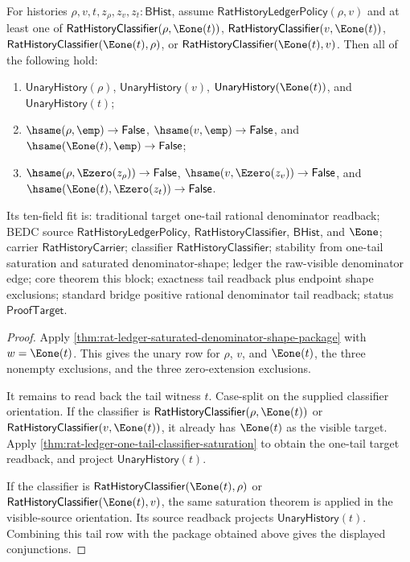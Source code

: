 \begin{theorem}
\label{thm:rat-ledger-one-tail-denominator-shape-readback}
For histories $\rho,v,t,z_\rho,z_v,z_t:\mathsf{BHist}$, assume
$\mathsf{RatHistoryLedgerPolicy}(\rho,v)$ and at least one of
$\mathsf{RatHistoryClassifier}(\rho,\Eone(t))$,
$\mathsf{RatHistoryClassifier}(v,\Eone(t))$,
$\mathsf{RatHistoryClassifier}(\Eone(t),\rho)$, or
$\mathsf{RatHistoryClassifier}(\Eone(t),v)$. Then all of the following hold:
\begin{enumerate}
\item $\mathsf{UnaryHistory}(\rho)$, $\mathsf{UnaryHistory}(v)$,
$\mathsf{UnaryHistory}(\Eone(t))$, and $\mathsf{UnaryHistory}(t)$;
\item $\hsame(\rho,\emp)\to\mathsf{False}$,
$\hsame(v,\emp)\to\mathsf{False}$, and
$\hsame(\Eone(t),\emp)\to\mathsf{False}$;
\item $\hsame(\rho,\Ezero(z_\rho))\to\mathsf{False}$,
$\hsame(v,\Ezero(z_v))\to\mathsf{False}$, and
$\hsame(\Eone(t),\Ezero(z_t))\to\mathsf{False}$.
\end{enumerate}

Its ten-field fit is: traditional target one-tail rational denominator
readback; BEDC source $\mathsf{RatHistoryLedgerPolicy}$,
$\mathsf{RatHistoryClassifier}$, $\mathsf{BHist}$, and $\Eone$; carrier
$\mathsf{RatHistoryCarrier}$; classifier $\mathsf{RatHistoryClassifier}$;
stability from one-tail saturation and saturated denominator-shape; ledger the
raw-visible denominator edge; core theorem this block; exactness tail readback
plus endpoint shape exclusions; standard bridge positive rational denominator
tail readback; status $\mathsf{ProofTarget}$.
\end{theorem}
\begin{proof}
Apply
\autoref{thm:rat-ledger-saturated-denominator-shape-package} with
$w=\Eone(t)$. This gives the unary row for $\rho$, $v$, and $\Eone(t)$, the
three nonempty exclusions, and the three zero-extension exclusions.

It remains to read back the tail witness $t$. Case-split on the supplied
classifier orientation. If the classifier is
$\mathsf{RatHistoryClassifier}(\rho,\Eone(t))$ or
$\mathsf{RatHistoryClassifier}(v,\Eone(t))$, it already has $\Eone(t)$ as the
visible target. Apply
\autoref{thm:rat-ledger-one-tail-classifier-saturation} to obtain the one-tail
target readback, and project $\mathsf{UnaryHistory}(t)$.

If the classifier is $\mathsf{RatHistoryClassifier}(\Eone(t),\rho)$ or
$\mathsf{RatHistoryClassifier}(\Eone(t),v)$, the same saturation theorem is
applied in the visible-source orientation. Its source readback projects
$\mathsf{UnaryHistory}(t)$. Combining this tail row with the package obtained
above gives the displayed conjunctions.
\end{proof}

